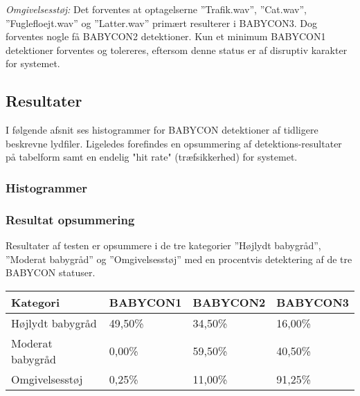 \textit{Omgivelsesstøj:} Det forventes at optagelserne ''Trafik.wav'', ''Cat.wav'', ''Fuglefloejt.wav'' og ''Latter.wav'' primært resulterer i BABYCON3. Dog forventes nogle få BABYCON2 detektioner. Kun et minimum BABYCON1 detektioner forventes og tolereres, eftersom denne status er af disruptiv karakter for systemet.

\subsection{Resultater} 
I følgende afsnit ses histogrammer for BABYCON detektioner af tidligere beskrevne lydfiler. Ligeledes forefindes en opsummering af detektions-resultater på tabelform samt en endelig "hit rate" (træfsikkerhed) for systemet.

\subsubsection{Histogrammer}

\subsubsection{Resultat opsummering}
Resultater af testen er opsummere i de tre kategorier ''Højlydt babygråd'', ''Moderat babygråd'' og ''Omgivelsesstøj'' med en procentvis detektering af de tre BABYCON statuser.

\begin{center}
    \begin{tabular}{ | l | l | l | l |}     					
    \hline
	\textbf{Kategori}	& \textbf{BABYCON1}	& \textbf{BABYCON2}	& \textbf{BABYCON3}  \\ \hline
    Højlydt babygråd	& 49,50\%			& 34,50\%			& 16,00\%   		\\ \hline
    Moderat babygråd 	& 0,00\%			& 59,50\%			& 40,50\%   		\\ \hline
    Omgivelsesstøj 		& 0,25\%			& 11,00\%			& 91,25\%   		\\ \hline
    \end{tabular}
\end{center}


